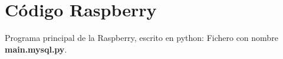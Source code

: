 
\chapter{Código Raspberry} %

\label{app:pythoncode} %

Programa principal de la Raspberry, escrito en python: Fichero con nombre \textbf{main.mysql.py}.

\newpage


